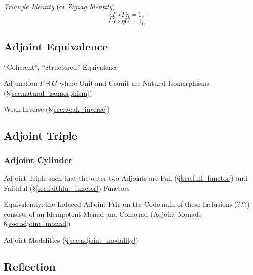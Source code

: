 \emph{Triangle Identity} (or \emph{Zigzag Identity})
\[
  \epsilon F \circ F \eta = 1_F
\]\[
  U \epsilon \circ \eta U = 1_U
\]



\subsection{Adjoint Equivalence}\label{sec:adjoint_equivalence}

``Coherent'', ``Structured'' Equivalence

Adjunction $F \dashv G$ where Unit and Counit are Natural Isomorphisms
(\S\ref{sec:natural_isomorphism})

Weak Inverse (\S\ref{sec:weak_inverse})



\subsection{Adjoint Triple}\label{sec:adjoint_triple}

\subsubsection{Adjoint Cylinder}\label{sec:adjoint_cylinder}

Adjoint Triple such that the outer two Adjoints are Full
(\S\ref{sec:full_functor}) and Faithful (\S\ref{sec:faithful_functor})
Functors

Equivalently: the Induced Adjoint Pair on the Codomain of these
Inclusions (???) consists of an Idempotent Monad and Comonad (Adjoint
Monads \S\ref{sec:adjoint_monad})

Adjoint Modalities (\S\ref{sec:adjoint_modality})



\subsection{Reflection}\label{sec:reflection_adjunction}

\cite{winskel-nielsen93}

